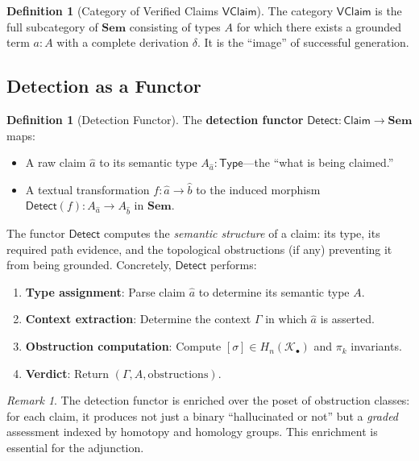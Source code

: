 \documentclass[11pt,a4paper]{article}
\theoremstyle{plain}
\theoremstyle{definition}
\newtheorem{definition}[theorem]{Definition}
\theoremstyle{remark}
\newtheorem{remark}[theorem]{Remark}
\newcommand{\Sem}{\mathbf{Sem}}
\newcommand{\Type}{\mathsf{Type}}
\newcommand{\Detect}{\mathsf{Detect}}
\begin{document}
\begin{definition}[Category of Verified Claims $\mathsf{VClaim}$]\label{def:vclaim-cat}
The category $\mathsf{VClaim}$ is the full subcategory of $\Sem$ consisting of types $A$ for which there exists a grounded term $a : A$ with a complete derivation $\delta$. It is the ``image'' of successful generation.
\end{definition}

\subsection{Detection as a Functor}

\begin{definition}[Detection Functor]\label{def:detect-functor}
The \textbf{detection functor} $\Detect\colon \mathsf{Claim} \to \Sem$ maps:
\begin{itemize}[nosep]
  \item A raw claim $\hat{a}$ to its semantic type $A_{\hat{a}} : \Type$---the ``what is being claimed.''
  \item A textual transformation $f\colon \hat{a} \to \hat{b}$ to the induced morphism $\Detect(f)\colon A_{\hat{a}} \to A_{\hat{b}}$ in $\Sem$.
\end{itemize}
The functor $\Detect$ computes the \emph{semantic structure} of a claim: its type, its required path evidence, and the topological obstructions (if any) preventing it from being grounded. Concretely, $\Detect$ performs:
\begin{enumerate}[nosep]
  \item \textbf{Type assignment}: Parse claim $\hat{a}$ to determine its semantic type $A$.
  \item \textbf{Context extraction}: Determine the context $\Gamma$ in which $\hat{a}$ is asserted.
  \item \textbf{Obstruction computation}: Compute $[\sigma] \in H_n(\mathcal{K}_\bullet)$ and $\pi_k$ invariants.
  \item \textbf{Verdict}: Return $(\Gamma, A, \text{obstructions})$.
\end{enumerate}
\end{definition}

\begin{remark}\label{rem:detect-enrichment}
The detection functor is enriched over the poset of obstruction classes: for each claim, it produces not just a binary ``hallucinated or not'' but a \emph{graded} assessment indexed by homotopy and homology groups. This enrichment is essential for the adjunction.
\end{remark}
\end{document}
